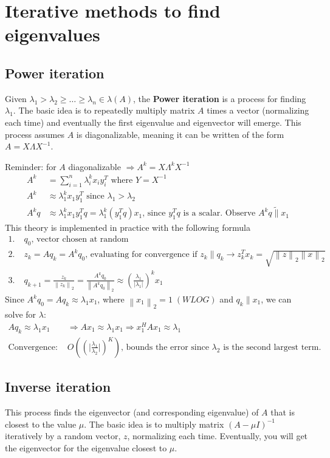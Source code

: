 \documentclass{article}
\newcommand{\norm}[2]{\left\lVert#1\right\rVert_#2}
\newcommand{\abs}[1]{\lvert#1\rvert}
\begin{document}
\section{Iterative methods to find eigenvalues}
\subsection{Power iteration}
Given $\lambda_1 > \lambda_2 \geq \dots \geq \lambda_n \in \lambda(A)$, the \textbf{Power iteration} is a process for finding $\lambda_1$. The basic idea is to repeatedly multiply matrix $A$ times a vector (normalizing each time) and eventually the first eigenvalue and eigenvector will emerge. This process assumes $A$ is diagonalizable, meaning it can be written of the form $A = X\Lambda X^{-1}$.

Reminder: for $A$ diagonalizable $\Longrightarrow A^k = X \Lambda^k X^{-1}$
\begin{align*}
    A^k &= \sum_{i = 1}^n \lambda_i^k x_i y_i^T \textrm{ where $Y = X^{-1}$}\\
    A^k &\approx \lambda_1^kx_1y_1^T \textrm{ since } \lambda_1 > \lambda_2\\
    A^kq &\approx \lambda_1^kx_1y_1^Tq = \lambda_1^k(y_1^Tq)x_1 \textrm{, since $y_1^Tq$ is a scalar. Observe } A^kq \tilde \parallel x_1
\end{align*}
This theory is implemented in practice with the following formula
\begin{align*}
    1. \;& q_0 \textrm{, vector chosen at random}\\
    2. \;& z_k = Aq_k = A^kq_0 \textrm{, evaluating for convergence if } z_k \parallel q_k \rightarrow z_k^Tx_k = \sqrt{\norm{z}{2}\norm{x}{2}}\\
    3. \;& q_{k+1} = \frac{z_k}{\norm{z_k}{2}} = \frac{A^kq_0}{\norm{A^kq_0}{2}} \approx (\frac{\lambda_1}{\abs{\lambda_1}})^kx_1
\end{align*}
Since $A^{k}q_0 = Aq_{k} \approx \lambda_1 x_1$, where $\norm{x_1}{2} = 1 \; (WLOG)$ and $q_k \parallel x_1$, we can solve for $\lambda$:
\begin{align*}
    Aq_k \approx \lambda_1 x_1 &\Longrightarrow Ax_1 \approx \lambda_1x_1 \Rightarrow x_1^HAx_1 \approx \lambda_1\\
    \textrm{Convergence: } &O((\abs{\frac{\lambda_1}{\lambda_2}})^K) \textrm{, bounds the error since $\lambda_2$ is the second largest term.}
\end{align*}


\subsection{Inverse iteration}
This process finds the eigenvector (and corresponding eigenvalue) of $A$ that is closest to the value $\mu$. The basic idea is to multiply matrix $(A - \mu I)^{-1}$ iteratively by a random vector, $z$, normalizing each time. Eventually, you will get the eigenvector for the eigenvalue closest to $\mu$.
\end{document}
